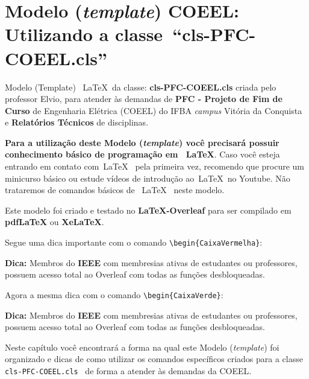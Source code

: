 \chapter*{Modelo ({\it template}) COEEL:  Utilizando a classe~``cls-PFC-COEEL.cls''}

Modelo (Template) ~\LaTeX ~da classe: {\bf cls-PFC-COEEL.cls} criada pelo professor Elvio, para atender às demandas de \textbf{PFC - Projeto de Fim de Curso} de Engenharia Elétrica (\gls{COEEL}) do IFBA {\it campus} Vitória da Conquista e \textbf{Relatórios Técnicos} de disciplinas.

{\bf Para a utilização deste Modelo ({\it template}) você precisará possuir conhecimento básico de programação em ~\LaTeX}. Caso você esteja entrando em contato com~\LaTeX~ pela primeira vez, recomendo que procure um minicurso básico ou estude vídeos de introdução ao~\LaTeX~no Youtube. Não trataremos de comandos básicos de ~\LaTeX~ neste modelo.

Este modelo foi criado e testado no  {\bf \LaTeX-Overleaf} para ser compilado em {\bf pdfLaTeX} ou {\bf XeLaTeX}.

Segue uma dica importante com o comando \verb|\begin{CaixaVermelha}|:

\begin{CaixaVermelha}
    {\bf Dica:} Membros do {\bf \gls{IEEE}} com membresias ativas de estudantes ou professores, possuem acesso total ao Overleaf com todas as funções desbloqueadas.
\end{CaixaVermelha}

Agora a mesma dica com o comando \verb|\begin{CaixaVerde}|:

\begin{CaixaVerde}
    {\bf Dica:} Membros do {\bf \gls{IEEE}} com membresias ativas de estudantes ou professores, possuem acesso total ao Overleaf com todas as funções desbloqueadas.
\end{CaixaVerde}

Neste capítulo você encontrará a forma na qual este Modelo ({\it template}) foi organizado e dicas de como utilizar os comandos específicos criados para a classe \verb|cls-PFC-COEEL.cls|~ de forma a atender às demandas da COEEL. 

\pagebreak\newpage\clearpage

